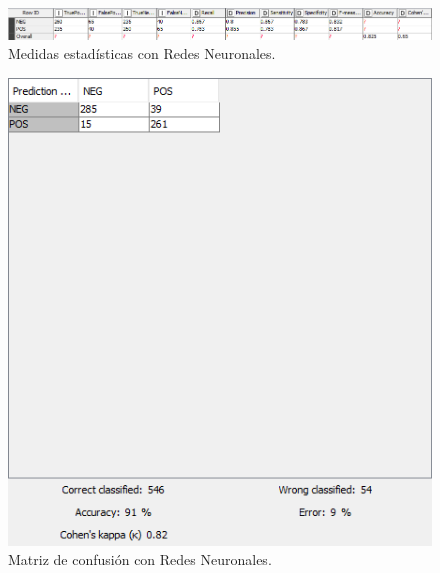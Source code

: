 \begin{figure}[t]
    \center\includegraphics[width=.95\linewidth]{img/classification/scoresNN.png}
    \caption{Medidas estadísticas con Redes Neuronales.}
\end{figure}


\begin{figure}[t]
    \center\includegraphics[width=.95\linewidth]{img/classification/cmRF.png}
    \caption{Matriz de confusión con Redes Neuronales.}
\end{figure}

